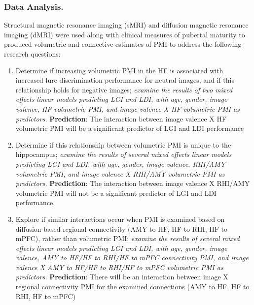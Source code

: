 \documentclass[11pt]{article}
\begin{document}
\subsubsection*{Data Analysis.} Structural magnetic resonance imaging (sMRI) and
diffusion magnetic resonance imaging (dMRI) were used along with clinical measures of
pubertal maturity to produced volumetric and
connective estimates of PMI to address the following research questions:
\begin{enumerate}
    \item Determine if increasing volumetric PMI in the HF is associated with increased
          lure discrimination performance for neutral images, and if this relationship
          holds for negative images; \textit{examine the results of two mixed effects
              linear models predicting LGI and LDI, with age, gender, image valence, HF
              volumetric PMI, and image valence X HF volumetric PMI as predictors.}
          \textbf{Prediction}: The interaction between image valence X HF volumetric PMI
          will be a significant predictor of LGI and LDI performance
    \item Determine if this relationship between volumetric PMI is unique to the
          hippocampus; \textit{examine the results of several mixed effects linear
              models predicting LGI and LDI, with age, gender, image valence, RHI/AMY
              volumetric PMI, and image valence X RHI/AMY volumetric PMI as predictors.}
          \textbf{Prediction}: The interaction between image valence X RHI/AMY
          volumetric PMI will not be a significant predictor of LGI and LDI performance.
    \item Explore if similar interactions occur when PMI is examined based on
          diffusion-based regional connectivity (AMY to HF, HF to RHI, HF to mPFC),
          rather than volumetric PMI\@; \textit{examine the results of several mixed
              effects linear models predicting LGI and LDI, with age, gender, image
              valence, AMY to HF/HF to RHI/HF to mPFC connectivity PMI, and image
              valence X AMY to HF/HF to RHI/HF to mPFC volumetric PMI as predictors.} 
              \textbf{Prediction}: There will be an interaction between image X regional
              connectivity PMI for the examined connections (AMY to HF, HF to RHI, HF to
              mPFC)
\end{enumerate}
\end{document}
